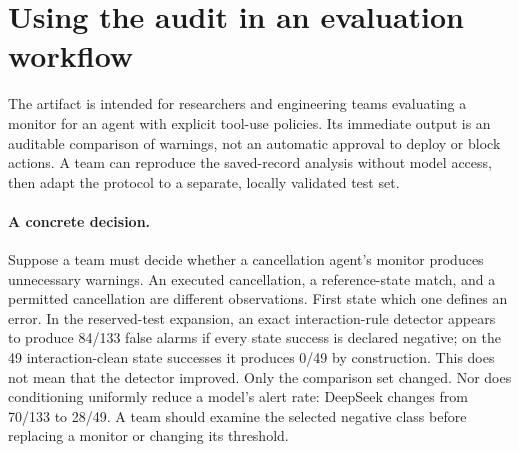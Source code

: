 \section{Using the audit in an evaluation workflow}
\label{sec:use}
The artifact is intended for researchers and engineering teams evaluating a monitor for an agent with explicit tool-use policies. Its immediate output is an auditable comparison of warnings, not an automatic approval to deploy or block actions. A team can reproduce the saved-record analysis without model access, then adapt the protocol to a separate, locally validated test set.

\paragraph{A concrete decision.}
Suppose a team must decide whether a cancellation agent's monitor produces unnecessary warnings. An executed cancellation, a reference-state match, and a permitted cancellation are different observations. First state which one defines an error. In the reserved-test expansion, an exact interaction-rule detector appears to produce 84/133 false alarms if every state success is declared negative; on the 49 interaction-clean state successes it produces 0/49 by construction. This does not mean that the detector improved. Only the comparison set changed. Nor does conditioning uniformly reduce a model's alert rate: DeepSeek changes from 70/133 to 28/49. A team should examine the selected negative class before replacing a monitor or changing its threshold.

